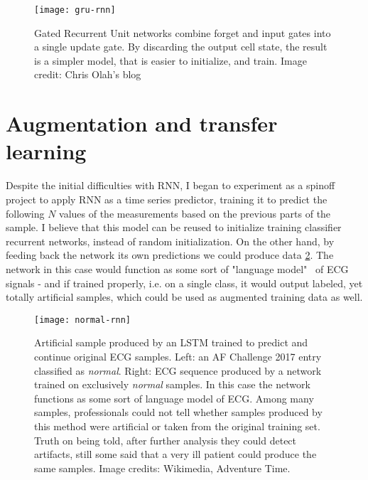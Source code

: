 \begin{figure}
  \centering
  \texttt{[image: gru-rnn]}
  \caption{Gated Recurrent Unit networks combine forget and input gates into a single update gate. By discarding the output cell state, the result is a simpler model, that is easier to initialize, and train. Image credit: Chris Olah's blog~\cite{chris_olah_understanding_nodate}}
  \label{fig:gru}
\end{figure}

\section{Augmentation and transfer learning}
Despite the initial difficulties with RNN, I began to experiment as a spinoff project to apply RNN as a time series predictor, training it to predict the following $N$ values of the measurements based on the previous parts of the sample. I believe that this model can be reused to initialize training classifier recurrent networks, instead of random initialization.
On the other hand, by feeding back the network its own predictions we could produce data \ref{fig:rnn-aug}. The network in this case would function as some sort of "language model"~\cite{mikolov_recurrent_2010} of ECG signals - and if trained properly, i.e. on a single class, it would output labeled, yet totally artificial samples, which could be used as augmented training data as well.

\begin{figure}
  \centering
  \texttt{[image: normal-rnn]}
  \caption{Artificial sample produced by an LSTM trained to predict and continue original ECG samples. Left: an AF Challenge 2017 entry classified as \textit{normal}. Right: ECG sequence produced by a network trained on exclusively \textit{normal} samples. In this case the network functions as some sort of language model of ECG. Among many samples, professionals could not tell whether samples produced by this method were artificial or taken from the original training set. Truth on being told, after further analysis they could detect artifacts, still some said that a very ill patient could produce the same samples. Image credits: Wikimedia, Adventure Time.}
  \label{fig:rnn-aug}
\end{figure}

